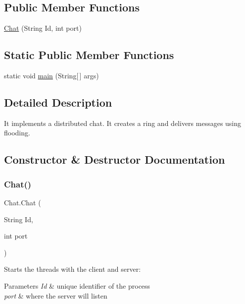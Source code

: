 \subsection*{Public Member Functions}
\begin{DoxyCompactItemize}
\item 
\hyperlink{class_chat_a91a76d5af693d46468ee876313ba7afe}{Chat} (String Id, int port)
\end{DoxyCompactItemize}
\subsection*{Static Public Member Functions}
\begin{DoxyCompactItemize}
\item 
static void \hyperlink{class_chat_a04e26027ad460092250efa75ce7a8a19}{main} (String\mbox{[}$\,$\mbox{]} args)
\end{DoxyCompactItemize}


\subsection{Detailed Description}
It implements a distributed chat. It creates a ring and delivers messages using flooding. 

\subsection{Constructor \& Destructor Documentation}
\hypertarget{class_chat_a91a76d5af693d46468ee876313ba7afe}{}\label{class_chat_a91a76d5af693d46468ee876313ba7afe} 
\subsubsection{\texorpdfstring{Chat()}{Chat()}}
{\footnotesize\ttfamily Chat.\+Chat (\begin{DoxyParamCaption}\item[{String}]{Id,  }\item[{int}]{port }\end{DoxyParamCaption})}

Starts the threads with the client and server\+: 
\begin{DoxyParams}{Parameters}
{\em Id} & unique identifier of the process \\
\hline
{\em port} & where the server will listen \\
\hline
\end{DoxyParams}


